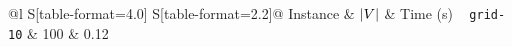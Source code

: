 \documentclass{article}
\DeclarePairedDelimiter{\abs}{\lvert}{\rvert}
\begin{document}
\begin{tabular}{@{}l S[table-format=4.0] S[table-format=2.2]@{}}
  \toprule
  Instance & {$\abs{V}$} & {Time (s)} \
  \midrule
  \texttt{grid-10} &  100 &  0.12 \
  \bottomrule
\end{tabular}
\end{document}
